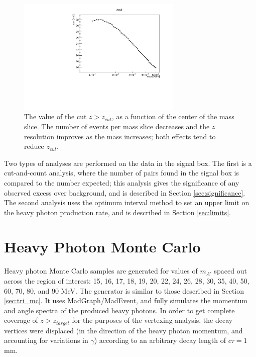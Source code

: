 \begin{figure}[ht]
\begin{center}
    \includegraphics[width=0.7\textwidth,page=1,angle=-90]{vertexing/figs/golden_mres_output}
\end{center}
\caption{The value of the cut $z>z_{cut}$, as a function of the center of the mass slice.
The number of events per mass slice decreases and the $z$ resolution improves as the mass increases; both effects tend to reduce $z_{cut}$.}
    \label{fig:zcut}
\end{figure}

Two types of analyses are performed on the data in the signal box.
The first is a cut-and-count analysis, where the number of pairs found in the signal box is compared to the number expected; this analysis gives the significance of any observed excess over background, and is described in Section \ref{sec:significance}.
The second analysis uses the optimum interval method to set an upper limit on the heavy photon production rate, and is described in Section \ref{sec:limits}.

\clearpage
\section{Heavy Photon Monte Carlo}
\label{sec:ap_mc}
Heavy photon Monte Carlo samples are generated for values of $m_{A'}$ spaced out across the region of interest: 15, 16, 17, 18, 19, 20, 22, 24, 26, 28, 30, 35, 40, 50, 60, 70, 80, and 90 MeV.
The generator is similar to those described in Section \ref{sec:tri_mc}.
It uses MadGraph/MadEvent, and fully simulates the momentum and angle spectra of the produced heavy photons.
In order to get complete coverage of $z>z_{target}$ for the purposes of the vertexing analysis, the decay vertices were displaced (in the direction of the heavy photon momentum, and accounting for variations in $\gamma$) according to an arbitrary decay length of $c\tau=1$ mm.

